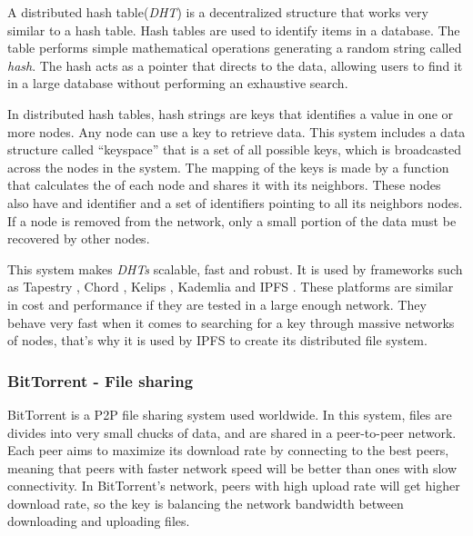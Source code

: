 A distributed hash table(\emph{DHT}) is a decentralized structure that works
very similar to a hash table. Hash tables are used to identify items in a
database. The table performs simple mathematical operations generating a random
string called \emph{hash}. The hash acts as a pointer that directs to the data,
allowing users to find it in a large database without performing an exhaustive
search\cite{kaluszka2010distributed}.

In distributed hash tables, hash strings are keys that identifies a value in one
or more nodes. Any node can use a key to retrieve data. This system includes a
data structure called ``keyspace'' that is a set of all possible keys, which is
broadcasted across the nodes in the system. The mapping of the keys is made by a
function that calculates the  of each node and shares it with its
neighbors. These nodes also have and identifier and a set of identifiers
pointing to all its neighbors nodes. If a node is removed from the network, only
a small portion of the data must be recovered by other
nodes\cite{kaluszka2010distributed}.

This system makes \emph{DHTs} scalable, fast and robust. It is used by
frameworks such as Tapestry \cite{zhao2004tapestry}, Chord
\cite{stoica2001chord}, Kelips \cite{gupta2003kelips}, Kademlia
\cite{maymounkov2002kademlia} and IPFS \cite{benet2014ipfs}. These platforms are
similar in cost and performance if they are tested in a large enough network.
They behave very fast when it comes to searching for a key through massive
networks of nodes\cite{li2004comparing}, that's why it is used by IPFS to create
its distributed file system.

\subsubsection*{BitTorrent - File sharing}
\label{tech:sec:ipfs:bt}
BitTorrent \cite{cohen2003incentives} is a P2P file sharing system used
worldwide. In this system, files are divides into very small chucks of data, and
are shared in a peer-to-peer network. Each peer aims to maximize its download
rate by connecting to the best peers, meaning that peers with faster network
speed will be better than ones with slow connectivity. In BitTorrent's network,
peers with high upload rate will get higher download rate, so the key is
balancing the network bandwidth between downloading and uploading
files\cite{pouwelse2005bittorrent}.

